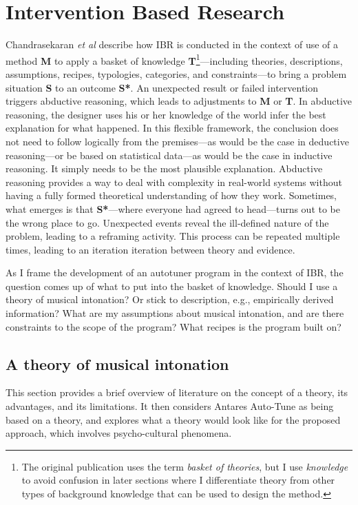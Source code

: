 \section{Intervention Based Research}
Chandrasekaran \textit{et al} \cite{chandrasekaran2020ibr} describe how IBR is conducted in the context of use of a method \textbf{M} to apply a basket of knowledge \textbf{T}\footnote{The original publication uses the term \textit{basket of theories}, but I use \textit{knowledge} to avoid confusion in later sections where I differentiate theory from other types of background knowledge that can be used to design the method.}---including theories, descriptions, assumptions, recipes, typologies, categories, and constraints---to bring a problem situation \textbf{S} to an outcome \textbf{S*}. An unexpected result or failed intervention triggers abductive reasoning, which leads to adjustments to \textbf{M} or \textbf{T}. In abductive reasoning, the designer uses his or her knowledge of the world infer the best explanation for what happened. In this flexible framework, the conclusion does not need to follow logically from the premises---as would be the case in deductive reasoning---or be based on statistical data---as would be the case in inductive reasoning. It simply needs to be the most plausible explanation. \cite{sep-abduction} Abductive reasoning provides a way to deal with complexity in real-world systems without having a fully formed theoretical understanding of how they work. Sometimes, what emerges is that \textbf{S*}---where everyone had agreed to head---turns out to be the wrong place to go. \cite{chandrasekaran2020ibr} Unexpected events reveal the ill-defined nature of the problem, leading to a reframing activity. This process can be repeated multiple times, leading to an iteration iteration between theory and evidence. 

As I frame the development of an autotuner program in the context of IBR, the question comes up of what to put into the basket of knowledge. Should I use a theory of musical intonation? Or stick to description, e.g., empirically derived information? What are my assumptions about musical intonation, and are there constraints to the scope of the program? What recipes is the program built on?

\subsection{A theory of musical intonation}
This section provides a brief overview of literature on the concept of a theory, its advantages, and its limitations. It then considers Antares Auto-Tune as being based on a theory, and explores what a theory would look like for the proposed approach, which involves psycho-cultural phenomena. 

